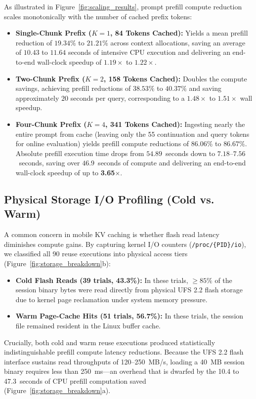 As illustrated in Figure~\ref{fig:scaling_results}, prompt prefill compute reduction scales monotonically with the number of cached prefix tokens:
\begin{itemize}
    \item \textbf{Single-Chunk Prefix ($K=1$, 84 Tokens Cached):} Yields a mean prefill reduction of $19.34\%$ to $21.21\%$ across context allocations, saving an average of $10.43$ to $11.64$ seconds of intensive CPU execution and delivering an end-to-end wall-clock speedup of $1.19\times$ to $1.22\times$.
    \item \textbf{Two-Chunk Prefix ($K=2$, 158 Tokens Cached):} Doubles the compute savings, achieving prefill reductions of $38.53\%$ to $40.37\%$ and saving approximately $20$ seconds per query, corresponding to a $1.48\times$ to $1.51\times$ wall speedup.
    \item \textbf{Four-Chunk Prefix ($K=4$, 341 Tokens Cached):} Ingesting nearly the entire prompt from cache (leaving only the 55 continuation and query tokens for online evaluation) yields prefill compute reductions of $86.06\%$ to $86.67\%$. Absolute prefill execution time drops from $54.89$~seconds down to $7.18$--$7.56$~seconds, saving over $46.9$~seconds of compute and delivering an end-to-end wall-clock speedup of up to \textbf{3.65$\times$}.
\end{itemize}

\subsection{Physical Storage I/O Profiling (Cold vs. Warm)}
A common concern in mobile KV caching is whether flash read latency diminishes compute gains. By capturing kernel I/O counters (\texttt{/proc/\{PID\}/io}), we classified all 90 reuse executions into physical access tiers (Figure~\ref{fig:storage_breakdown}b):
\begin{itemize}
    \item \textbf{Cold Flash Reads (39 trials, 43.3\%):} In these trials, $\ge 85\%$ of the session binary bytes were read directly from physical UFS 2.2 flash storage due to kernel page reclamation under system memory pressure.
    \item \textbf{Warm Page-Cache Hits (51 trials, 56.7\%):} In these trials, the session file remained resident in the Linux buffer cache.
\end{itemize}
Crucially, both cold and warm reuse executions produced statistically indistinguishable prefill compute latency reductions. Because the UFS 2.2 flash interface sustains read throughputs of 120--250~MB/s, loading a 40~MB session binary requires less than 250~ms—an overhead that is dwarfed by the 10.4 to 47.3~seconds of CPU prefill computation saved (Figure~\ref{fig:storage_breakdown}a).
